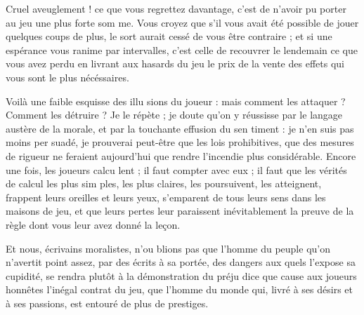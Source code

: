 Cruel aveuglement ! ce que vous
regrettez davantage, c'est de n'avoir
pu porter au jeu une plus forte som%
me. Vous croyez que s'il vous avait
été possible de jouer quelques coups
de plus, le sort aurait cessé de vous
être contraire ;  et si une espérance
vous ranime par intervalles, c'est
celle de recouvrer le lendemain ce
que vous avez perdu en livrant aux
hasards du jeu le prix de la vente des
effets qui vous sont le plus nécéssaires.

Voilà une faible esquisse des illu%
sions du joueur : mais comment les
attaquer ? Comment les détruire ? Je
le répète ; je doute qu'on y réussisse
par le langage austère de la morale,
et par la touchante effusion du sen%
timent : je n'en suis pas moins per%
suadé, je prouverai peut-être que les
lois prohibitives, que des mesures de
rigueur ne feraient aujourd'hui que
rendre l'incendie plus considérable.
Encore une fois, les joueurs calcu%
lent ; il faut compter avec eux ; il faut
que les vérités de calcul les plus sim%
ples, les plus claires, les poursuivent,
les atteignent, frappent leurs oreilles
et leurs yeux, s'emparent de tous
leurs sens dans les maisons de jeu,
et que leurs pertes leur paraissent
inévitablement la preuve de la règle
dont vous leur avez donné la leçon.

Et nous, écrivains moralistes, n'ou%
blions pas que l'homme du peuple
qu'on n'avertit point assez, par des
écrits à sa portée, des dangers aux%
quels l'expose sa cupidité, se rendra
plutôt à la démonstration du préju%
dice que cause aux joueurs honnêtes
l'inégal contrat du jeu, que l'homme
du monde qui, livré à ses désirs et
à ses passions, est entouré de plus de
prestiges.
